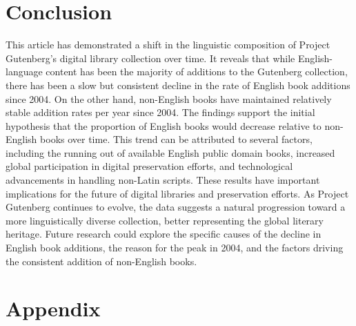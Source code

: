 \documentclass[11pt]{article}
\begin{document}
\section{Conclusion}
This article has demonstrated a shift in the linguistic composition of Project Gutenberg's digital library collection over time. It reveals that while English-language content has been the majority of additions to the Gutenberg collection, there has been a slow but consistent decline in the rate of English book additions since 2004. On the other hand, non-English books have maintained relatively stable addition rates per year since 2004.
The findings support the initial hypothesis that the proportion of English books would decrease relative to non-English books over time. This trend can be attributed to several factors, including the running out of available English public domain books, increased global participation in digital preservation efforts, and technological advancements in handling non-Latin scripts.
These results have important implications for the future of digital libraries and preservation efforts. As Project Gutenberg continues to evolve, the data suggests a natural progression toward a more linguistically diverse collection, better representing the global literary heritage. 
Future research could explore the specific causes of the decline in English book additions, the reason for the peak in 2004, and the factors driving the consistent addition of non-English books. 
\printbibliography
\clearpage
\section{Appendix} \label{Appendix}
\end{document}
